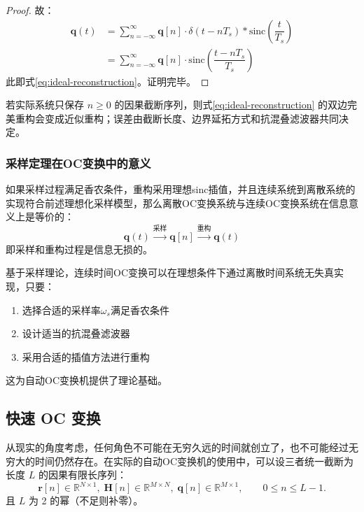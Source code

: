 \begin{proof}
    故：
    \begin{align*}
        \mathbf{q}(t) & = \sum_{n=-\infty}^{\infty} \mathbf{q}[n] \cdot \delta(t - nT_s) * \text{sinc}\left(\dfrac{t}{T_s}\right) \\
                      & = \sum_{n=-\infty}^{\infty} \mathbf{q}[n] \cdot \text{sinc}\left(\dfrac{t - nT_s}{T_s}\right)
    \end{align*}
    此即式\eqref{eq:ideal-reconstruction}。证明完毕。
\end{proof}

\begin{remark}
    若实际系统只保存 $n\geq 0$ 的因果截断序列，则式\eqref{eq:ideal-reconstruction} 的双边完美重构会变成近似重构；误差由截断长度、边界延拓方式和抗混叠滤波器共同决定。
\end{remark}

\subsubsection{采样定理在OC变换中的意义}

\begin{theorem}[离散到连续的完备性]
    如果采样过程满足香农条件，重构采用理想sinc插值，并且连续系统到离散系统的实现符合前述理想化采样模型，那么离散OC变换系统与连续OC变换系统在信息意义上是等价的：
    \begin{equation}
        \mathbf{q}(t) \xrightarrow{\text{采样}} \mathbf{q}[n] \xrightarrow{\text{重构}} \mathbf{q}(t)
    \end{equation}
    即采样和重构过程是信息无损的。
\end{theorem}

基于采样理论，连续时间OC变换可以在理想条件下通过离散时间系统无失真实现，只要：
\begin{enumerate}
    \item 选择合适的采样率$\omega_s$满足香农条件
    \item 设计适当的抗混叠滤波器
    \item 采用合适的插值方法进行重构
\end{enumerate}
这为自动OC变换机提供了理论基础。

\subsection{快速 OC 变换}
\label{subsec:fast-oc}

从现实的角度考虑，任何角色不可能在无穷久远的时间就创立了，也不可能经过无穷大的时间仍然存在。在实际的自动OC变换机的使用中，可以设三者统一截断为长度 $L$ 的因果有限长序列：
\begin{equation}
    \mathbf{r}[n]\in\mathbb{R}^{N\times 1},\;
    \mathbf{H}[n]\in\mathbb{R}^{M\times N},\;
    \mathbf{q}[n]\in\mathbb{R}^{M\times 1},\qquad
    0\le n\le L-1.
\end{equation}
且 $L$ 为 2 的幂（不足则补零）。

